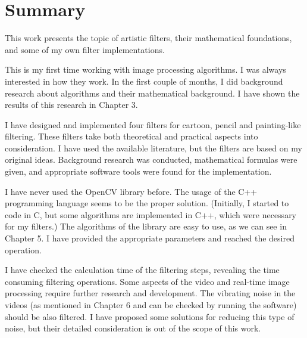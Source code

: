 \documentclass[a4paper,12pt]{article}
\begin{document}
\pagestyle{empty}

\section*{Summary}

This work presents the topic of artistic filters, their mathematical foundations, and some of my own filter implementations. 

This is my first time working with image processing algorithms. I was always interested in how they work. In the first couple of months, I did background research about algorithms and their mathematical background. I have shown the results of this research in Chapter 3. 

I have designed and implemented four filters for cartoon, pencil and painting-like filtering. These filters take both theoretical and practical aspects into consideration. I have used the available literature, but the filters are based on my original ideas. Background research was conducted, mathematical formulas were given, and appropriate software tools were found for the implementation. 

I have never used the OpenCV library before. The usage of the C++ programming language seems to be the proper solution. (Initially, I started to code in C, but some algorithms are implemented in C++, which were necessary for my filters.) The algorithms of the library are easy to use, as we can see in Chapter 5. I have provided the appropriate parameters and reached the desired operation. 

I have checked the calculation time of the filtering steps, revealing the time consuming filtering operations. Some aspects of the video and real-time image processing require further research and development. The vibrating noise in the videos (as mentioned in Chapter 6 and can be checked by running the software) should be also filtered. I have proposed some solutions for reducing this type of noise, but their detailed consideration is out of the scope of this work.
\end{document}
